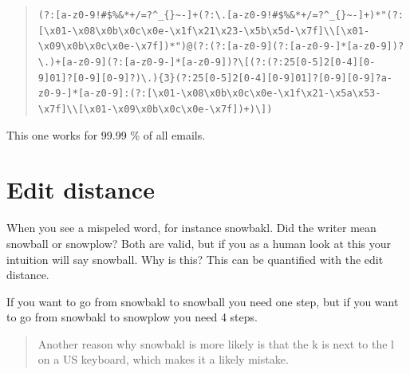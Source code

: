 \documentclass[
  11pt,
  british,
]{article}
\begin{document}
\begin{quote}
\texttt{(?:{[}a-z0-9!\#\$\%\&\textquotesingle{}*+/=?\^{}\_\textasciigrave{}\{\textbar{}\}\textasciitilde{}-{]}+(?:\textbackslash{}.{[}a-z0-9!\#\$\%\&\textquotesingle{}*+/=?\^{}\_\textasciigrave{}\{\textbar{}\}\textasciitilde{}-{]}+)*\textbar{}"(?:{[}\textbackslash{}x01-\textbackslash{}x08\textbackslash{}x0b\textbackslash{}x0c\textbackslash{}x0e-\textbackslash{}x1f\textbackslash{}x21\textbackslash{}x23-\textbackslash{}x5b\textbackslash{}x5d-\textbackslash{}x7f{]}\textbar{}\textbackslash{}\textbackslash{}{[}\textbackslash{}x01-\textbackslash{}x09\textbackslash{}x0b\textbackslash{}x0c\textbackslash{}x0e-\textbackslash{}x7f{]})*")@(?:(?:{[}a-z0-9{]}(?:{[}a-z0-9-{]}*{[}a-z0-9{]})?\textbackslash{}.)+{[}a-z0-9{]}(?:{[}a-z0-9-{]}*{[}a-z0-9{]})?\textbar{}\textbackslash{}{[}(?:(?:25{[}0-5{]}\textbar{}2{[}0-4{]}{[}0-9{]}\textbar{}{[}01{]}?{[}0-9{]}{[}0-9{]}?)\textbackslash{}.)\{3\}(?:25{[}0-5{]}\textbar{}2{[}0-4{]}{[}0-9{]}\textbar{}{[}01{]}?{[}0-9{]}{[}0-9{]}?\textbar{}{[}a-z0-9-{]}*{[}a-z0-9{]}:(?:{[}\textbackslash{}x01-\textbackslash{}x08\textbackslash{}x0b\textbackslash{}x0c\textbackslash{}x0e-\textbackslash{}x1f\textbackslash{}x21-\textbackslash{}x5a\textbackslash{}x53-\textbackslash{}x7f{]}\textbar{}\textbackslash{}\textbackslash{}{[}\textbackslash{}x01-\textbackslash{}x09\textbackslash{}x0b\textbackslash{}x0c\textbackslash{}x0e-\textbackslash{}x7f{]})+)\textbackslash{}{]})}
\end{quote}

This one works for 99.99 \% of all emails.

\hypertarget{edit-distance}{%
\section{Edit distance}\label{edit-distance}}

When you see a mispeled word, for instance snowbakl. Did the writer mean
snowball or snowplow? Both are valid, but if you as a human look at this
your intuition will say snowball. Why is this? This can be quantified
with the edit distance.

If you want to go from snowbakl to snowball you need one step, but if
you want to go from snowbakl to snowplow you need 4 steps.

\begin{quote}
Another reason why snowbakl is more likely is that the k is next to the
l on a US keyboard, which makes it a likely mistake.
\end{quote}
\end{document}
